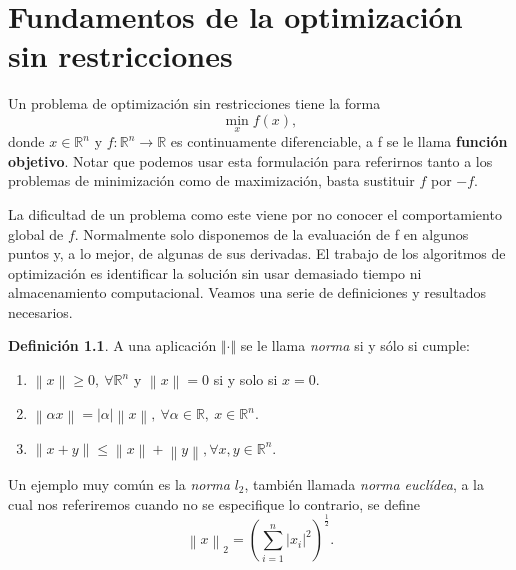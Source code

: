 \documentclass[11pt,a4paper]{book}
\theoremstyle{definition}
\newtheorem{definition}[theorem]{Definición}
\theoremstyle{remark}
\newcommand{\norm}[1]{\left\lVert#1\right\rVert}
\begin{document}
\chapter{Fundamentos de la optimización sin restricciones}

Un problema de optimización sin restricciones tiene la forma 
\begin{equation}
	\min_{x}f\left(x\right),
	\label{eq:minf}
\end{equation}
donde $x\in\mathbb{R}^{n}$ y $f : \mathbb{R}^{n} \rightarrow \mathbb{R}$ es continuamente
diferenciable, a f se le llama \textbf{función objetivo}. 
Notar que podemos usar esta formulación para referirnos tanto a los problemas de minimización
como de maximización, basta sustituir $f$ por $-f$. 

La dificultad de un problema como este viene por no conocer el comportamiento
global de $f$. Normalmente solo disponemos de la evaluación de f en algunos puntos y,
a lo mejor, de algunas de sus derivadas. El trabajo de los algoritmos de
optimización es identificar la solución sin usar demasiado tiempo ni almacenamiento computacional.
Veamos una serie de definiciones y resultados necesarios.
 
\begin{definition}
	A una aplicación $\Vert \cdot \Vert$ se le llama \textit{norma} si y sólo si cumple:
	\vspace{-0.4cm}
	\begin{enumerate}
		\item $\norm{x} \geq 0, \: \forall \mathbb{R}^n$ y $\norm{x}=0$ si y solo si $x=0$.
		\item $\norm{\alpha x} = \vert \alpha \vert \norm{x},\: \forall \alpha \in \mathbb{R},\: x\in \mathbb{R}^n.$
		\item $\norm{x+y} \leq \norm{x} + \norm{y}, \forall x,y \in \mathbb{R}^n$.
	\end{enumerate}
\end{definition}

Un ejemplo muy común es la
\textit{norma} $l_2$, también llamada \textit{norma euclídea}, a la cual nos referiremos cuando no se especifique lo contrario, se define
\begin{equation}
		\norm{x}_2 = \left( \sum_{i=1}^n \vert x_i \vert^2 \right)^{\frac{1}{2}}.
\end{equation}
\end{document}
